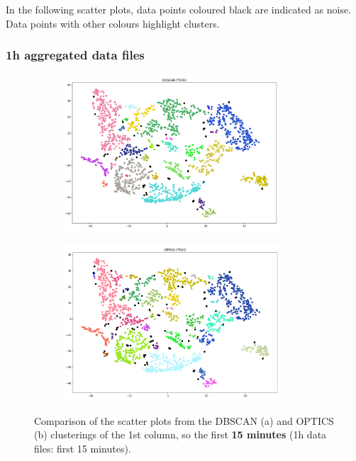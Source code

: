 In the following scatter plots, data points coloured black are indicated as noise. Data points with other colours highlight clusters.

\subsubsection{1h aggregated data files}

\begin{figure}[H]
	\centering
	\begin{subfigure}{.5\textwidth}
    \centering
    \includegraphics[width=0.9\textwidth]{./images/clusteringResults/1h-1-DBSCAN.png}
  \end{subfigure}%
  \begin{subfigure}{.5\textwidth}
    \centering
    \includegraphics[width=0.9\textwidth]{./images/clusteringResults/1h-1-OPTICS.png}
	\end{subfigure}
	\caption{Comparison of the scatter plots from the DBSCAN (a) and OPTICS (b) clusterings of the 1st column, so the first \textbf{15 minutes} (1h data files: first 15 minutes).}
  \label{figure:finalClustering1h-1}
\end{figure}

